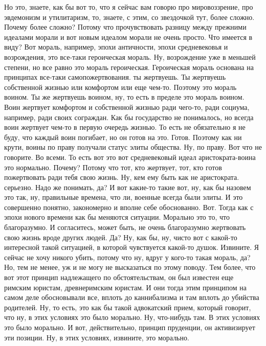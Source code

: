 Но это, знаете, как бы вот то, что я сейчас вам говорю про
мировоззрение, про эвдемонизм и утилитаризм, то, знаете, с этим, со звездочкой
тут, более сложно. Почему более сложно? Потому что прочувствовать разницу между
прежними идеалами морали и вот новым идеалом морали не очень просто. Что имеется
в виду? Вот мораль, например, эпохи античности, эпохи средневековья и
возрождения, это все-таки героическая мораль. Ну, возрождение уже в меньшей
степени, но все равно это мораль героическая. Героическая мораль основана на
принципах все-таки самопожертвования. ты жертвуешь. Ты жертвуешь собственной
жизнью или комфортом или еще чем-то. Поэтому это мораль воином. Ты же жертвуешь
воином, ну, то есть в пределе это мораль воином. Воин жертвует комфортом и
собственной жизнью ради чего-то, ради социума, например, ради своих сограждан.
Как бы государство не понималось, но всегда воин жертвует чем-то в первую
очередь жизнью. То есть не обязательно я не буду, что каждый воин погибает, но
он готов на это. Готов. Поэтому как ни крути, воины по праву получали статус
элиты общества. Ну, по праву. Вот что не говорите. Во всеми. То есть вот это вот
средневековый идеал аристократа-воина это нормально. Почему? Потому что тот, кто
жертвует, тот, кто готов пожертвовать ради тебя свою жизнь. Ну, кем ему быть как
не аристократа. серьезно. Надо же понимать, да? И вот какие-то такие вот, ну,
как бы назовем это так, ну, правильные времена, что ли, военные всегда были
элиты. И это совершенно понятно, закономерно и вполне себе обоснованно. Вот.
Тогда как с эпохи нового времени как бы меняются ситуации. Морально это то, что
благоразумно. И согласитесь, может быть, не очень благоразумно жертвовать свою
жизнь вроде других людей. Да? Ну, как бы, ну, чисто вот с какой-то интересной
такой ситуацией, в которой чувствуется какой-то душок. Извините. Я сейчас не
хочу никого убить, потому что ну, вдруг у кого-то такая мораль, да? Но, тем не
менее, уж и не могу не высказаться по этому поводу. Тем более, что вот этот
принцип надлежащего по обстоятельствам, он был известен еще римским юристам,
древнеримским юристам. И они тогда этим принципом на самом деле обосновывали
все, вплоть до каннибализма и там вплоть до убийства родителей. Ну, то есть, это
как бы такой адвокатский прием, который говорит, что ну, в этих условиях это
было морально. Ну, что-нибудь там. В этих условиях это было морально. И вот,
действительно, принцип пруденции, он активизирует эти позиции. Ну, в этих
условиях, извините, это морально. 

